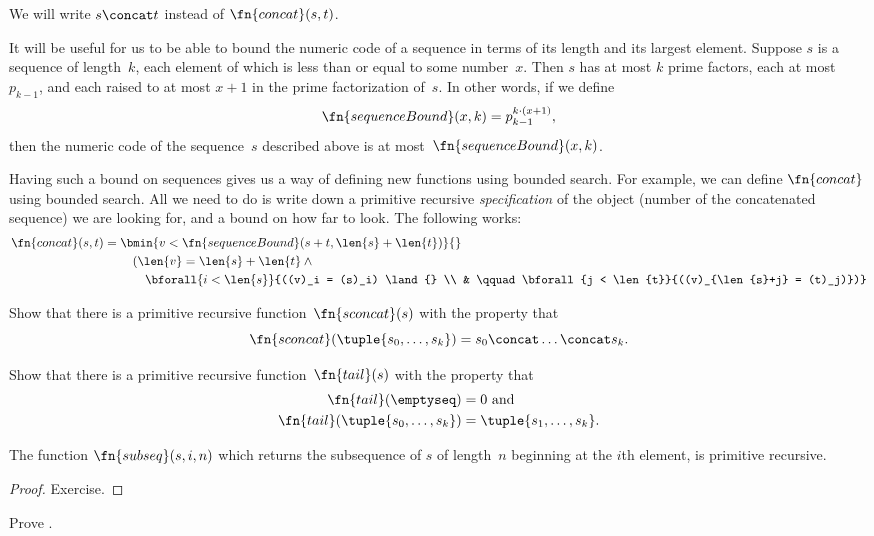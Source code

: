 \documentclass[../../../include/open-logic-section]{subfiles}
\begin{document}
We will write $s \concat t$ instead of $\fn{concat}(s,t)$.

It will be useful for us to be able to bound the numeric code of a
sequence in terms of its length and its largest element. Suppose $s$
is a sequence of length~$k$, each element of which is less than or equal
to some number~$x$. Then $s$ has at most $k$ prime factors, each at
most~$p_{k-1}$, and each raised to at most $x+1$ in the prime
factorization of~$s$. In other words, if we define
\[
\fn{sequenceBound}(x,k) = p_{k-1}^{k \cdot (x+1)},
\]
then the numeric code of the sequence~$s$ described above is at
most~$\fn{sequenceBound}(x,k)$.

Having such a bound on sequences gives us a way of defining new
functions using bounded search. For example, we can define
$\fn{concat}$ using bounded search. All we need to do is write down a
primitive recursive \emph{specification} of the object (number of the
concatenated sequence) we are looking for, and a bound on how far to
look. The following works:
\begin{align*}
  \fn{concat}(s,t) = {} & \bmin{v < \fn{sequenceBound}(s+t,\len{s} +
    \len{t})}{} \\
  & \quad(\len{v} = \len{s} + \len{t} \land {}\\
    & \qquad \bforall{i < \len{s}}{((v)_i = (s)_i) \land {} \\
      & \qquad \bforall{j < \len{t}}{((v)_{\len{s}+j} = (t)_j)})}
\end{align*}

\begin{prob}
Show that there is a primitive recursive function~$\fn{sconcat}(s)$
with the property that
\[
\fn{sconcat}(\tuple{s_0, \dots, s_k}) = s_0 \concat \dots \concat s_k.
\]
\end{prob}

\begin{prob}
Show that there is a primitive recursive function~$\fn{tail}(s)$
with the property that
\begin{align*}
  \fn{tail}(\emptyseq) & = 0 \text{ and}\\
  \fn{tail}(\tuple{s_0, \dots, s_{k}}) & = \tuple{s_1, \dots, s_{k}}.
\end{align*}
\end{prob}

\begin{prop}
  The function $\fn{subseq}(s, i, n)$ which returns the subsequence
  of $s$ of length~$n$ beginning at the $i$th element, is primitive
  recursive.
\end{prop}

\begin{proof}
  Exercise.
\end{proof}

\begin{prob}
  Prove .
\end{prob}
  
\end{document}
